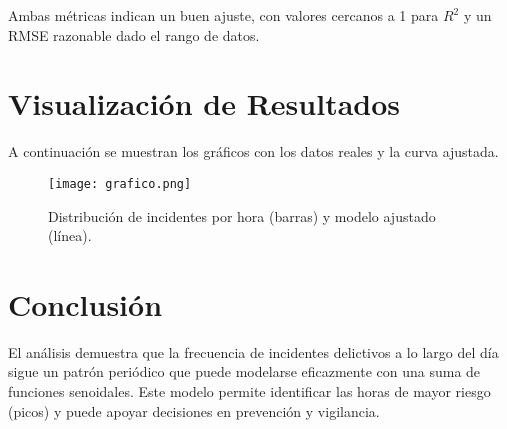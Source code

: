 \documentclass[a4paper,12pt]{article}
\begin{document}
Ambas métricas indican un buen ajuste, con valores cercanos a 1 para \( R^2 \) y un RMSE razonable dado el rango de datos.

\section{Visualización de Resultados}

A continuación se muestran los gráficos con los datos reales y la curva ajustada.

\begin{figure}[H]
    \centering
    \texttt{[image: grafico.png]}
    \caption{Distribución de incidentes por hora (barras) y modelo ajustado (línea).}
\end{figure}

\section{Conclusión}

El análisis demuestra que la frecuencia de incidentes delictivos a lo largo del día sigue un patrón periódico que puede modelarse eficazmente con una suma de funciones senoidales. Este modelo permite identificar las horas de mayor riesgo (picos) y puede apoyar decisiones en prevención y vigilancia.

\vspace{1em}
\end{document}
